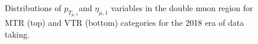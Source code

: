 \begin{figure}[htbp]
{    }
  \caption{Distributions of $p_{T_{\mu,1}}$and $\eta_{\mu,1}$ variables in the double muon region for MTR (top) and VTR (bottom) categories for the 2018 era of data taking.}
  \label{app:2018_Zmumu_1}
\end{figure}

